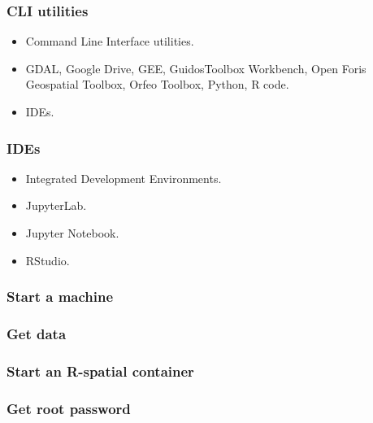 \begin{frame}
	\frametitle{CLI utilities}
	\begin{itemize}
		\item Command Line Interface utilities.
		\item GDAL, Google Drive, GEE, GuidosToolbox Workbench, Open Foris
		      Geospatial Toolbox, Orfeo Toolbox, Python, R code.
		\item IDEs.
	\end{itemize}
\end{frame}

\begin{frame}
	\frametitle{IDEs}
	\begin{itemize}
		\item Integrated Development Environments.
		\item JupyterLab.
		\item Jupyter Notebook.
		\item RStudio.
	\end{itemize}
\end{frame}

\begin{frame}
	\frametitle{Start a machine}
\end{frame}

\begin{frame}
	\frametitle{Get data}
\end{frame}

\begin{frame}
	\frametitle{Start an R-spatial container}
\end{frame}

\begin{frame}
	\frametitle{Get root password}
\end{frame}
